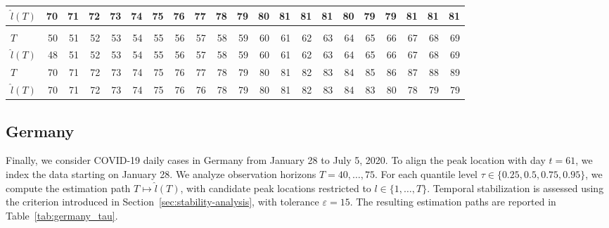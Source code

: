 \documentclass[12pt,a4paper]{article}
\begin{document}
{\begin{landscape}
\begin{table}[htbp]
\begin{tabular*}{\linewidth}{@{\extracolsep{\fill}}lrrrrrrrrrrrrrrrrrrrr}
					$\hat{l}(T)$ & 70 & 71 & 72 & 73 & 74 & 75 & 76 & 77 & 78 & 79 & 80 & 81 & 81 & 81 & 80 & 79 & 79 & 81 & 81 & 81 \\
					\midrule\addlinespace[2.5pt]
					\multicolumn{21}{c}{\textbf{$\tau=0.95,\ T_{\mathrm{entry}}=85,\ \varepsilon=5$}} \\
					\addlinespace[2.5pt]
					\midrule
					$T$ & 50 & 51 & 52 & 53 & 54 & 55 & 56 & 57 & 58 & 59 & 60 & 61 & 62 & 63 & 64 & 65 & 66 & 67 & 68 & 69 \\
					$\hat{l}(T)$ & 48 & 51 & 52 & 53 & 54 & 55 & 56 & 57 & 58 & 59 & 60 & 61 & 62 & 63 & 64 & 65 & 66 & 67 & 68 & 69 \\
					$T$ & 70 & 71 & 72 & 73 & 74 & 75 & 76 & 77 & 78 & 79 & 80 & 81 & 82 & 83 & 84 & 85 & 86 & 87 & 88 & 89 \\
					$\hat{l}(T)$ & 70 & 71 & 72 & 73 & 74 & 75 & 76 & 76 & 78 & 79 & 80 & 81 & 82 & 83 & 84 & 83 & 80 & 78 & 79 & 79 \\
					\bottomrule
				\end{tabular*}
			\end{table}
		\end{landscape}
		
		\subsection{Germany}
		\label{subsec:germany}
		
		Finally, we consider COVID-19 daily cases in Germany from January 28 to July 5, 2020. To align the peak location with day $t=61$, we index the data starting on January 28. We analyze observation horizons $T=40,\ldots,75$. For each quantile level $\tau\in\{0.25,0.5,0.75,0.95\}$, we compute the estimation path $T\mapsto\hat{l}(T)$, with candidate peak locations restricted to $l\in\{1,\ldots,T\}$. Temporal stabilization is assessed using the criterion introduced in Section~\ref{sec:stability-analysis}, with tolerance $\varepsilon=15$. The resulting estimation paths are reported in Table~\ref{tab:germany_tau}.
		
}
\end{document}
